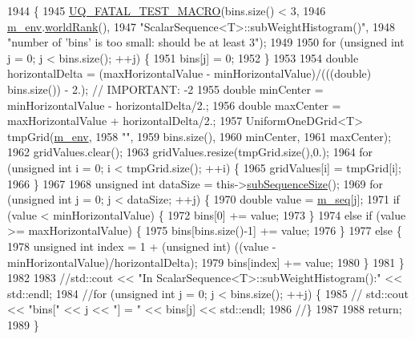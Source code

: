 \begin{DoxyCode}
1944 \{
1945   \hyperlink{_defines_8h_a56d63d18d0a6d45757de47fcc06f574d}{UQ\_FATAL\_TEST\_MACRO}(bins.size() < 3,
1946                       \hyperlink{class_q_u_e_s_o_1_1_scalar_sequence_a71618cd6351b29361b437af68447a4c8}{m\_env}.\hyperlink{class_q_u_e_s_o_1_1_base_environment_a78b57112bbd0e6dd0e8afec00b40ffa7}{worldRank}(),
1947                       \textcolor{stringliteral}{"ScalarSequence<T>::subWeightHistogram()"},
1948                       \textcolor{stringliteral}{"number of 'bins' is too small: should be at least 3"});
1949 
1950   \textcolor{keywordflow}{for} (\textcolor{keywordtype}{unsigned} \textcolor{keywordtype}{int} j = 0; j < bins.size(); ++j) \{
1951     bins[j] = 0;
1952   \}
1953 
1954   \textcolor{keywordtype}{double} horizontalDelta = (maxHorizontalValue - minHorizontalValue)/(((\textcolor{keywordtype}{double}) bins.size()) - 2.); \textcolor{comment}{//
       IMPORTANT: -2}
1955   \textcolor{keywordtype}{double} minCenter = minHorizontalValue - horizontalDelta/2.;
1956   \textcolor{keywordtype}{double} maxCenter = maxHorizontalValue + horizontalDelta/2.;
1957   UniformOneDGrid<T> tmpGrid(\hyperlink{class_q_u_e_s_o_1_1_scalar_sequence_a71618cd6351b29361b437af68447a4c8}{m\_env},
1958                                     \textcolor{stringliteral}{""},
1959                                     bins.size(),
1960                               minCenter,
1961                               maxCenter);
1962   gridValues.clear();
1963   gridValues.resize(tmpGrid.size(),0.);
1964   \textcolor{keywordflow}{for} (\textcolor{keywordtype}{unsigned} \textcolor{keywordtype}{int} i = 0; i < tmpGrid.size(); ++i) \{
1965     gridValues[i] = tmpGrid[i];
1966   \}
1967 
1968   \textcolor{keywordtype}{unsigned} \textcolor{keywordtype}{int} dataSize = this->\hyperlink{class_q_u_e_s_o_1_1_scalar_sequence_a0288ea295eedc216a1617b3286f6f3a0}{subSequenceSize}();
1969   \textcolor{keywordflow}{for} (\textcolor{keywordtype}{unsigned} \textcolor{keywordtype}{int} j = 0; j < dataSize; ++j) \{
1970     \textcolor{keywordtype}{double} value = \hyperlink{class_q_u_e_s_o_1_1_scalar_sequence_ae616036fd2e62fb69df167814545e893}{m\_seq}[j];
1971     \textcolor{keywordflow}{if} (value < minHorizontalValue) \{
1972       bins[0] += value;
1973     \}
1974     \textcolor{keywordflow}{else} \textcolor{keywordflow}{if} (value >= maxHorizontalValue) \{
1975       bins[bins.size()-1] += value;
1976     \}
1977     \textcolor{keywordflow}{else} \{
1978       \textcolor{keywordtype}{unsigned} \textcolor{keywordtype}{int} index = 1 + (\textcolor{keywordtype}{unsigned} int) ((value - minHorizontalValue)/horizontalDelta);
1979       bins[index] += value;
1980     \}
1981   \}
1982 
1983   \textcolor{comment}{//std::cout << "In ScalarSequence<T>::subWeightHistogram():" << std::endl;}
1984   \textcolor{comment}{//for (unsigned int j = 0; j < bins.size(); ++j) \{}
1985   \textcolor{comment}{//  std::cout << "bins[" << j << "] = " << bins[j] << std::endl;}
1986   \textcolor{comment}{//\}}
1987 
1988   \textcolor{keywordflow}{return};
1989 \}
\end{DoxyCode}
